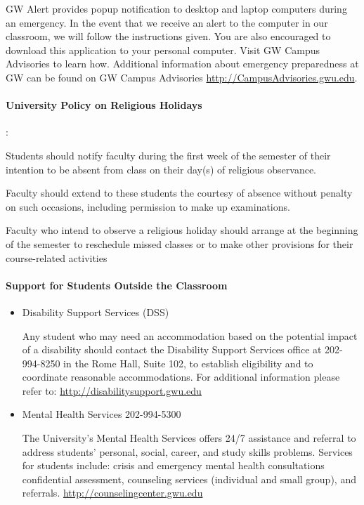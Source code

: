 \documentclass[10pt]{article}
\begin{document}
GW Alert provides popup notification to desktop and laptop computers during an emergency. In the event that we receive an alert to the computer in our classroom, we will follow the instructions given. You are also encouraged to download this application to your personal computer. Visit GW Campus Advisories to learn how. Additional  information  about  emergency  preparedness  at  GW  can  be  found  on  GW  Campus  Advisories \url{http://CampusAdvisories.gwu.edu}.
 

\paragraph*{University Policy on Religious Holidays}
\begin{list}
{:}
{\setlength{\itemsep}{-3pt}}

\item Students should notify faculty during the first week of the semester of their intention to be absent from class on their day(s) of religious observance. 
\item Faculty should extend to these students the courtesy of absence without penalty on such occasions, including permission to make up examinations. 
\item Faculty who intend to observe a religious holiday should arrange at the beginning of the semester to reschedule missed classes or to make other provisions for their course-related activities
\end{list}

\paragraph*{Support for Students Outside the Classroom}

\begin{itemize}
\item Disability Support Services (DSS)

Any student who may need an accommodation based on the potential impact of a disability should contact the Disability Support Services office at 202-994-8250 in the Rome Hall, Suite 102, to establish eligibility and to coordinate reasonable accommodations. For additional information please refer to: \url{http://disabilitysupport.gwu.edu}

\item Mental Health Services 202-994-5300	

The University's Mental Health Services offers 24/7 assistance and referral to address students' personal, social, career, and study skills problems. Services for students include: crisis and emergency mental health consultations confidential assessment, counseling services (individual and small group), and referrals.  \url{http://counselingcenter.gwu.edu}

\end{itemize}
\end{document}
